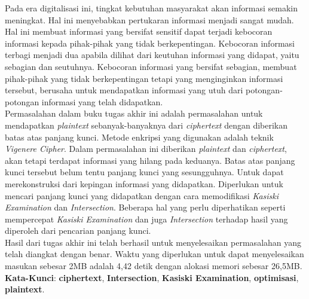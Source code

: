 \begin{abstrak}
		\indent Pada era digitalisasi ini, tingkat kebutuhan masyarakat akan informasi semakin meningkat. Hal ini menyebabkan pertukaran informasi menjadi sangat mudah. Hal ini membuat informasi yang bersifat sensitif dapat terjadi kebocoran informasi kepada pihak-pihak yang tidak berkepentingan. Kebocoran informasi terbagi menjadi dua apabila dilihat dari keutuhan informasi yang didapat, yaitu sebagian dan seutuhnya. Kebocoran informasi yang bersifat sebagian, membuat pihak-pihak yang tidak berkepentingan tetapi yang menginginkan informasi tersebut, berusaha untuk mendapatkan informasi yang utuh dari potongan-potongan informasi yang telah didapatkan. 
\\
\indent Permasalahan dalam buku tugas akhir ini adalah permasalahan untuk mendapatkan \textit{plaintext} sebanyak-banyaknya dari \textit{ciphertext} dengan diberikan batas atas panjang kunci. Metode enkripsi yang digunakan adalah  teknik \textit{Vigenere Cipher}. Dalam permasalahan ini diberikan \textit{plaintext} dan \textit{ciphertext}, akan tetapi terdapat informasi yang hilang pada keduanya. Batas atas panjang kunci tersebut belum tentu panjang kunci yang sesungguhnya. Untuk dapat merekonstruksi \plaintext dari kepingan informasi yang didapatkan. Diperlukan untuk mencari panjang kunci yang didapatkan dengan cara memodifikasi \textit{Kasiski Examination} dan \textit{Intersection}. Beberapa hal yang perlu diperhatikan seperti mempercepat \textit{Kasiski Examination} dan juga \textit{Intersection} terhadap hasil yang diperoleh dari pencarian panjang kunci.
\\  
\indent Hasil dari tugas akhir ini telah berhasil untuk menyelesaikan permasalahan yang telah diangkat dengan benar. Waktu yang diperlukan untuk dapat menyelesaikan masukan sebesar 2MB adalah 4,42 detik dengan alokasi memori sebesar 26,5MB.
\\
\noindent \textbf{Kata-Kunci}: \textbf{ciphertext}, \textbf{Intersection}, \textbf{Kasiski Examination}, \textbf{optimisasi}, \textbf{plaintext}.
\end{abstrak}


